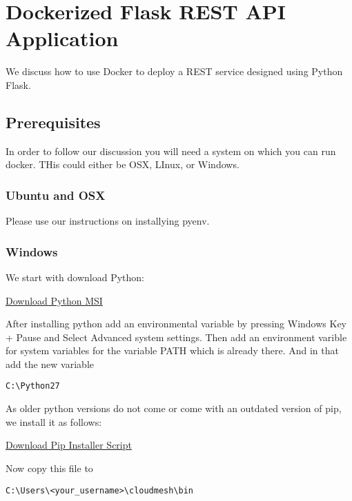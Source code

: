 

\section{Dockerized Flask REST API Application}
\label{s:docker-flask-rest} 
\FILENAME

We discuss how to use Docker to deploy a REST service designed using
Python Flask.

\subsection{Prerequisites}

In order to follow our discussion you will need a system on which you
can run docker. THis could either be OSX, LInux, or Windows.


\subsubsection{Ubuntu and OSX}

Please use our instructions on installying pyenv.

\subsubsection{Windows}

We start with download Python:

\href{https://www.python.org/ftp/python/2.7.14/python-2.7.14.msi}{Download
Python MSI}

After installing python add an environmental variable by pressing
Windows Key + Pause and Select Advanced system settings. Then add an
environment varible for system variables for the variable PATH which is
already there. And in that add the new variable

\begin{lstlisting}
C:\Python27
\end{lstlisting}

As older python versions do not come or come with an outdated version of
pip, we install it as follows:

\href{https://bootstrap.pypa.io/get-pip.py}{Download Pip Installer
Script}

Now copy this file to

\begin{lstlisting}
C:\Users\<your_username>\cloudmesh\bin
\end{lstlisting}

